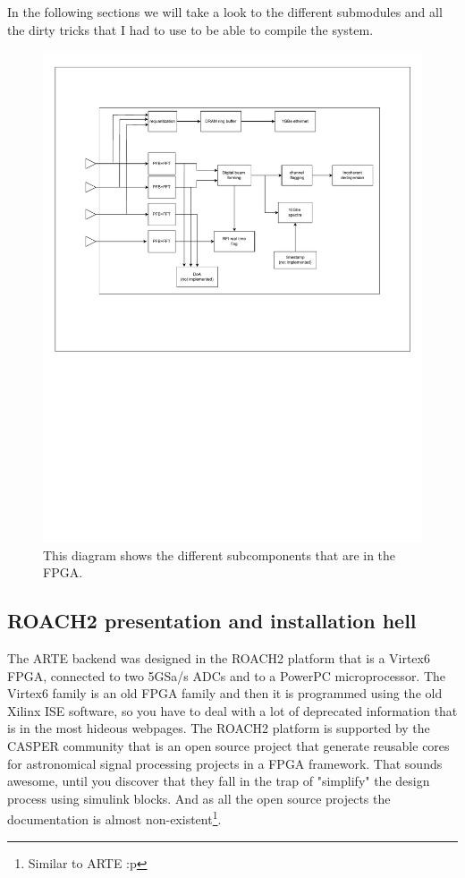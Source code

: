 In the following sections we will take a look to the different submodules and all the dirty tricks that I had to use to be able to compile the system.

\begin{figure}
    \centering
    \includegraphics[width=\textwidth]{images/general_backend_diagram.pdf}
    \caption{This diagram shows the different subcomponents that are in the FPGA.}
    \label{fig:backend_diagram}
\end{figure}

\newpage
\subsection{ROACH2 presentation and installation hell}

The ARTE backend was designed in the ROACH2 platform that is a Virtex6 FPGA, connected to two 5GSa/s ADCs and to a PowerPC microprocessor. The Virtex6 family is an old FPGA family and then it is programmed using the old Xilinx ISE software, so you have to deal with a lot of deprecated information that is in the most hideous webpages. The ROACH2 platform is supported by the CASPER community that is an open source project that generate reusable cores for astronomical signal processing projects in a FPGA framework. That sounds awesome, until you discover that they fall in the trap of "simplify" the design process using simulink blocks. And as all the open source projects the documentation is almost non-existent\footnote{Similar to ARTE :p}.

